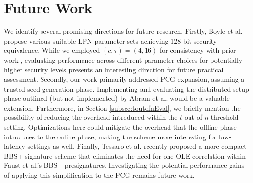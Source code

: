 \section{Future Work}
We identify several promising directions for future research. Firstly, Boyle et al. \cite{boyle2020efficient} propose various suitable LPN parameter sets achieving 128-bit security equivalence. While we employed $(c,\tau)=(4,16)$ for consistency with prior work \cite{abram2022low}, evaluating performance across different parameter choices for potentially higher security levels presents an interesting direction for future practical assessment. Secondly, our work primarily addressed PCG expansion, assuming a trusted seed generation phase. Implementing and evaluating the distributed setup phase outlined (but not implemented) by Abram et al. \cite{abram2022low} would be a valuable extension. Furthermore, in Section \ref{subsec:toutofnEval}, we briefly mention the possibility of reducing the overhead introduced within the $t$-out-of-$n$ threshold setting. Optimizations here could mitigate the overhead that the offline phase introduces to the online phase, making the scheme more interesting for low-latency settings as well. Finally, Tessaro et al. \cite{tessaro2023revisiting} recently proposed a more compact BBS+ signature scheme that eliminates the need for one OLE correlation within Faust et al.'s BBS+ presignatures. Investigating the potential performance gains of applying this simplification to the PCG remains future work.

